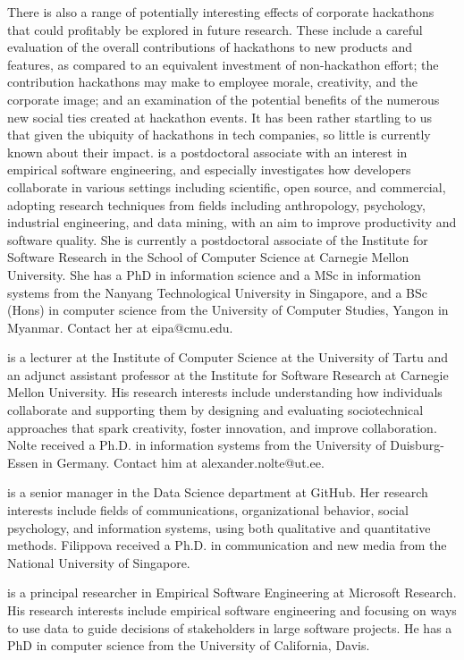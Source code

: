 \documentclass{hcij}
\begin{document}
There is also a range of potentially interesting effects of corporate hackathons that could profitably be explored in future research. These include a careful evaluation of the overall contributions of hackathons to new products and features, as compared to an equivalent investment of non-hackathon effort; the contribution hackathons may make to employee morale, creativity, and the corporate image; and an examination of the potential benefits of the numerous new social ties created at hackathon events. It has been rather startling to us that given the ubiquity of hackathons in tech companies, so little is currently known about their impact.
\newpage
\titlenotesoncontributors
{} {is a postdoctoral associate with an interest in empirical software engineering, and especially investigates how developers collaborate in various settings including scientific, open source, and commercial, adopting research techniques from fields including anthropology, psychology, industrial engineering, and data mining, with an aim to improve productivity and software quality. She is currently a postdoctoral associate of the Institute for Software Research in the School of Computer Science at Carnegie Mellon University. She has a PhD in information science and a MSc in information systems from the Nanyang Technological University in Singapore, and a BSc (Hons) in computer science from the University of Computer Studies, Yangon in Myanmar. Contact her at eipa@cmu.edu.}

 {is a lecturer at the Institute of Computer Science at the University of Tartu and an adjunct assistant professor at the Institute for Software Research at Carnegie Mellon University. His research interests include understanding how individuals collaborate and supporting them by designing and evaluating sociotechnical approaches that spark creativity, foster innovation, and improve collaboration. Nolte received a Ph.D. in information systems from the University of Duisburg-Essen in Germany. Contact him at alexander.nolte@ut.ee.}

 {is a senior manager in the Data Science department at GitHub. Her research interests include fields of communications, organizational behavior, social psychology, and information systems, using both qualitative and quantitative methods. Filippova received a Ph.D. in communication and new media from the National University of Singapore.}

 {is a principal researcher in Empirical Software Engineering at Microsoft Research. His research interests include empirical software engineering and focusing on ways to use data to guide decisions of stakeholders in large software projects. He has a PhD in computer science from the University of California, Davis.}
\end{document}
